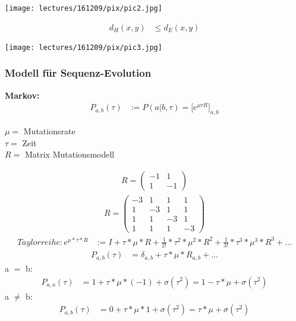 \begin{center}
	\texttt{[image: lectures/161209/pix/pic2.jpg]}		
\end{center}

\begin{align*}
	d_H (x,y) &\leq d_E (x,y)
\end{align*}

\begin{center}
	\texttt{[image: lectures/161209/pix/pic3.jpg]}
\end{center}

\newpage	

\subsubsection{Modell für Sequenz-Evolution}
\textbf{Markov:}
\begin{align*}
	P_{a,b}(\tau) &:= P(a | b, \tau) = \biggl[e^{\mu \tau R} \biggr]_{a,b}
\end{align*}

$\mu = $ Mutationsrate\\
$\tau = $ Zeit\\
$R = $ Matrix Mutationsmodell

\begin{align*}
	R = \begin{pmatrix}
		-1 & 1\\
		 1 &-1
	\end{pmatrix}
\end{align*}
\begin{align*}
	R = \begin{pmatrix}
		-3 & 1 & 1 & 1\\
		 1 &-3 & 1 & 1\\
		 1 & 1 &-3 & 1\\
		 1 & 1 & 1 &-3
	\end{pmatrix}
\end{align*}
\begin{align*}
	Taylorreihe: e^{\mu * \tau * R} &:= I + \tau * \mu * R + \frac{1}{2!} * \tau^2 * \mu^2 * R^2 + \frac{1}{3!} * \tau^3 * \mu^3 * R^3 + ...
\end{align*}
\begin{align*}
	P_{a,b}(\tau) &= \delta_{a,b} + \tau * \mu * R_{a,b} + ...
\end{align*}
a $=$ b:
\begin{align*}
	P_{a,a}(\tau) &= 1 + \tau * \mu * (-1) + \sigma (\tau ^2) = 1 - \tau * \mu + \sigma (\tau ^2)
\end{align*}
a $\neq$ b:
\begin{align*}
	P_{a,b}(\tau) &= 0 + \tau * \mu * 1 + \sigma (\tau ^2) = \tau * \mu + \sigma (\tau ^2)
\end{align*}

